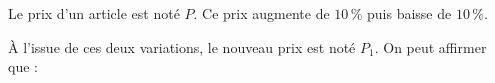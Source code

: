 
Le prix d'un article est noté $P$. Ce prix augmente de $10\,\%$ puis baisse de $10\,\%$.

À l'issue de ces deux variations, le nouveau prix est noté $P_1$. On peut affirmer que :

\smallskip

